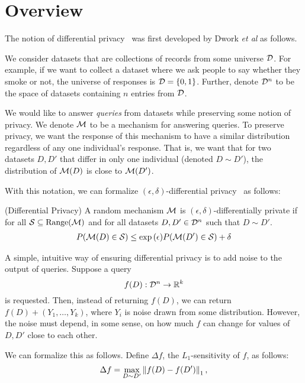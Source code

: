 \documentclass{article} %
\begin{document}
\section{Overview}\label{overview}
The notion of differential privacy~\cite{dwork2006calibrating} was first
developed by Dwork \emph{et al} as follows.


We consider datasets that are collections of records from some universe $\mathcal{D}$.
For example, if we want to collect a dataset where we ask people to say whether
they smoke or not, the universe of responses is $\mathcal{D} = \{0, 1\}$. Further,
denote $\mathcal{D}^n$ to be the space of datasets containing $n$ entries from $\mathcal{D}$.

We would like to answer \textit{queries} from datasets while preserving some
notion of privacy. We denote $\mathcal{M}$ to be a mechanism for answering
queries. To preserve privacy, we want the response of this mechanism
to have a similar distribution regardless of any one individual's response.
That is, we want that for two datasets $D, D'$ that differ in only one
individual (denoted $D \sim D'$), the distribution of $\mathcal{M}(D)$ is close to
$\mathcal{M}(D')$.

With this notation, we can formalize $(\epsilon, \delta)$-differential
privacy~\cite{dwork2014algorithmic} as follows:

\begin{definition}{(Differential Privacy)}
A random mechanism $\mathcal{M}$ is $(\epsilon, \delta)$-differentially private
if for all $\mathcal{S} \subseteq \textup{Range}(\mathcal{M})$ and for all
datasets $D, D' \in \mathcal{D}^n$ such that $D \sim D'$.
\begin{align*}
P(\mathcal{M}(D) \in \mathcal{S}) \leq \exp{(\epsilon)} P(\mathcal{M}(D') \in \mathcal{S}) + \delta
\end{align*}
\end{definition}

A simple, intuitive way of ensuring differential privacy is to add noise to the
output of queries. Suppose a query
\[ f(D) : \mathcal{D}^n \rightarrow \mathbb{R}^k \]
is requested. Then, instead of returning $f(D)$, we can return
$f(D) + (Y_1, \dots, Y_k)$, where $Y_i$ is noise drawn from some distribution.
However, the noise must depend, in some sense, on how much $f$ can change for
values of $D, D'$ close to each other.

We can formalize this as follows. Define $\Delta f$, the $L_1$-sensitivity of
$f$, as follows:
\begin{align*}
\Delta f = \max_{D \sim D'} \left\lVert f(D) - f(D')\right\rVert_1,
\end{align*}
\end{document}
